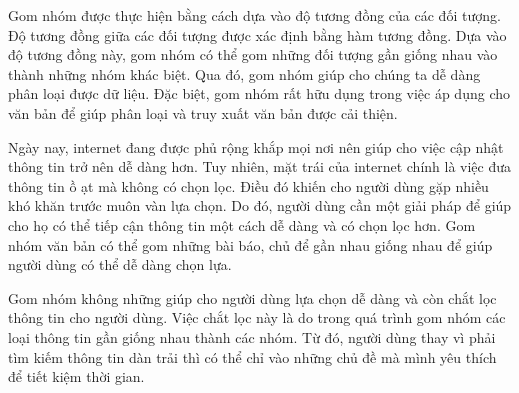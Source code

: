 Gom nhóm được thực hiện bằng cách dựa vào độ tương đồng của các đối tượng.
Độ tương đồng giữa các đối tượng được xác định bằng hàm tương đồng.
Dựa vào độ tương đồng này, gom nhóm có thể gom những đối tượng gần giống nhau vào thành những nhóm khác biệt.
Qua đó, gom nhóm giúp cho chúng ta dễ dàng phân loại được dữ liệu.
Đặc biệt, gom nhóm rất hữu dụng trong việc áp dụng cho văn bản để giúp phân loại và truy xuất văn bản được cải thiện.

Ngày nay, internet đang được phủ rộng khắp mọi nơi nên giúp cho việc cập nhật thông tin trở nên dễ dàng hơn.
Tuy nhiên, mặt trái của internet chính là việc đưa thông tin ồ ạt mà không có chọn lọc.
Điều đó khiến cho người dùng gặp nhiều khó khăn trước muôn vàn lựa chọn.
Do đó, người dùng cần một giải pháp để giúp cho họ có thể tiếp cận thông tin một cách dễ dàng và có chọn lọc hơn.
Gom nhóm văn bản có thể gom những bài báo, chủ để gần nhau giống nhau để giúp người dùng có thể dễ dàng chọn lựa.

Gom nhóm không những giúp cho người dùng lựa chọn dễ dàng và còn chắt lọc thông tin cho người dùng.
Việc chắt lọc này là do trong quá trình gom nhóm các loại thông tin gần giống nhau thành các nhóm.
Từ đó, người dùng thay vì phải tìm kiếm thông tin dàn trải thì có thể chỉ vào những chủ đề mà mình yêu thích để tiết kiệm thời gian.

%

